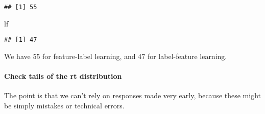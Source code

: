 \documentclass[
]{article}
\newenvironment{Shaded}{\begin{snugshade}}{\end{snugshade}}
\newcommand{\DataTypeTok}[1]{\textcolor[rgb]{0.13,0.29,0.53}{#1}}
\newcommand{\DecValTok}[1]{\textcolor[rgb]{0.00,0.00,0.81}{#1}}
\newcommand{\KeywordTok}[1]{\textcolor[rgb]{0.13,0.29,0.53}{\textbf{#1}}}
\newcommand{\NormalTok}[1]{#1}
\newcommand{\OperatorTok}[1]{\textcolor[rgb]{0.81,0.36,0.00}{\textbf{#1}}}
\newcommand{\StringTok}[1]{\textcolor[rgb]{0.31,0.60,0.02}{#1}}
\begin{document}
\begin{verbatim}
## [1] 55
\end{verbatim}

\begin{Shaded}
\begin{Highlighting}[]
\NormalTok{lf}
\end{Highlighting}
\end{Shaded}

\begin{verbatim}
## [1] 47
\end{verbatim}

We have 55 for feature-label learning, and 47 for label-feature
learning.

\hypertarget{check-tails-of-the-rt-distribution}{%
\paragraph{Check tails of the rt
distribution}\label{check-tails-of-the-rt-distribution}}

The point is that we can't rely on responses made very early, because
these might be simply mistakes or technical errors.

\begin{Shaded}
\end{Shaded}
\end{document}
